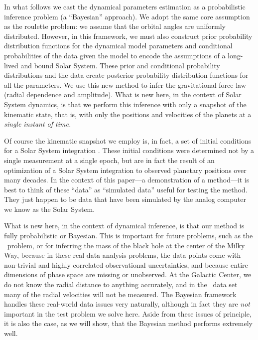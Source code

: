 In what follows we cast the dynamical parameters estimation as a
probabilistic inference problem (a ``Bayesian'' approach). We adopt
the same core assumption as the roulette problem: we assume that the
orbital angles are uniformly distributed. However, in this framework,
we must also construct prior probability distribution functions for
the dynamical model parameters and conditional probabilities of the
data given the model to encode the assumptions of a long-lived and
bound Solar System.  These prior and conditional probability
distributions and the data create posterior probability distribution
functions for all the parameters. We use this new method to infer the
gravitational force law (radial dependence and amplitude).  What is
new here, in the context of Solar System dynamics, is that we perform
this inference with only a snapshot of the kinematic state, that is,
with only the positions and velocities of the planets at a
\emph{single instant of time.}

Of course the kinematic snapshot we employ is, in fact, a set of
initial conditions for a Solar System integration \citep{Giorgini96a}.
These initial conditions were determined not by a single measurement
at a single epoch, but are in fact the result of an optimization of a
Solar System integration to observed planetary positions over many
decades.  In the context of this paper---a demonstration of a
method---it is best to think of these ``data'' as ``simulated data''
useful for testing the method.  They just happen to be data that have
been simulated by the analog computer we know as the Solar System.

What is new here, in the context of dynamical inference, is that our
method is fully probabilistic or Bayesian.  This is important for
future problems, such as the \Gaia\ problem, or for inferring the mass
of the black hole at the center of the Milky Way, because in these
real data analysis problems, the data points come with non-trivial and
highly correlated observational uncertainties, and because entire
dimensions of phase space are missing or unobserved.  At the Galactic
Center, we do not know the radial distance to anything accurately, and
in the \Gaia\ data set many of the radial velocities will not be
measured.  The Bayesian framework handles these real-world data issues
very naturally, although in fact they are \emph{not} important in the
test problem we solve here.  Aside from these issues of principle, it
is also the case, as we will show, that the Bayesian method performs
extremely well.

